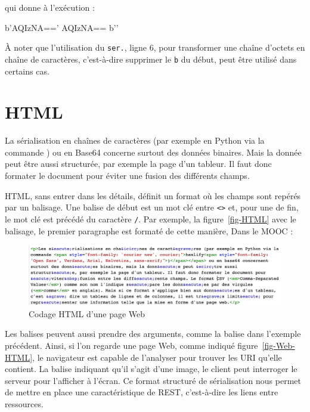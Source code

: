 qui donne à l’exécution :

\begin{termc}[backgroundcolor=\color{backcolour}]
b'AQIzNA=='
AQIzNA==
b''
\end{termc}

À noter que l'utilisation du \texttt{ser.}, ligne 6, pour transformer une chaîne d'octets en chaîne de caractères, c'est-à-dire supprimer le \texttt{b} du début, peut être utilisé dans certains cas.



\section{HTML}

La sérialisation en chaînes de caractères (par exemple en Python via la commande ) ou en Base64 concerne surtout des données binaires. Mais la donnée peut être aussi structurée, par exemple la page d'un tableur. Il faut donc formater le document pour éviter une fusion des différents champs.


\ac{HTML}, sans entrer dans les détails, définit un format où les champs sont repérés par un balisage.  Une balise de début est un mot clé entre \texttt{<>} et, pour une  de fin, le mot clé est précédé du caractère \texttt{/}. Par exemple, la figure~\vref{fig-HTML} avec le balisage, le premier paragraphe est formaté de cette manière, Dans le MOOC :

\begin{figure}[tbp]
\centerline{\includegraphics[width=1\columnwidth]{Pictures/Capture22.png}}
\caption{Codage HTML d'une page Web}
\label{fig-HTML}
\end{figure}

Les balises peuvent aussi prendre des arguments, comme la balise  dans l'exemple précédent. Ainsi, si l'on regarde une page Web, comme indiqué figure~\vref{fig-Web-HTML}, le navigateur est capable de l'analyser pour trouver les \ac{URI} qu'elle contient. La balise \texttt{} indiquant qu'il s'agit d'une image, le client peut interroger le serveur pour l'afficher à l'écran. Ce format structuré de sérialisation nous permet de mettre en place une caractéristique de \ac{REST}, c'est-à-dire les liens entre ressources.

